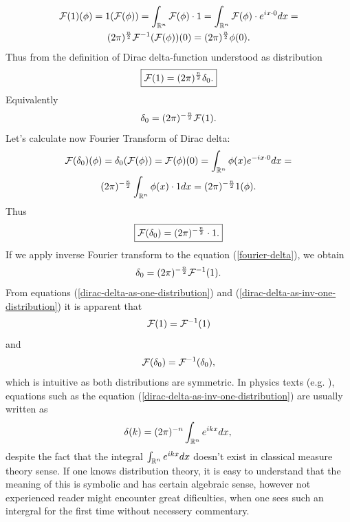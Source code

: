 \documentclass[main.tex]{subfiles}
\begin{document}
\begin{multline}
\\
\mathcal{F}(1)(\phi) = 1(\mathcal{F}(\phi)) = \int_{\mathbb{R}^n} \mathcal{F}(\phi) \cdot 1 = \int_{\mathbb{R}^n} \mathcal{F}(\phi) \cdot e^{ix\cdot 0} dx = \\
(2\pi)^\frac{n}{2}\mathcal{F}^{-1}(\mathcal{F}(\phi))(0) = (2\pi)^\frac{n}{2}\phi(0).\\
\end{multline}
Thus from the definition of Dirac delta-function understood as distribution
\begin{equation}
\boxed{
\label{dirac-delta-as-one-distribution}
\mathcal{F}(1) = (2\pi)^\frac{n}{2}\delta_0. 
}
\end{equation}
Equivalently 
\begin{equation}
\delta_0 = (2\pi)^{-\frac{n}{2}}\mathcal{F}(1).
\end{equation}
Let's calculate now Fourier Transform of Dirac delta:
\begin{multline}
\mathcal{F}(\delta_0)(\phi) = \delta_0 (\mathcal{F}(\phi)) = \mathcal{F}(\phi)(0) =  \int_{\mathbb{R}^n} \phi(x) e^{-ix\cdot 0}dx = \\
(2\pi)^{-\frac{n}{2}} \int_{\mathbb{R}^n} \phi(x) \cdot 1 dx =  (2\pi)^{-\frac{n}{2}} 1(\phi).
\\
\end{multline}
Thus
\begin{equation}
\boxed{
\label{fourier-delta}
\mathcal{F}(\delta_0) = (2\pi)^{-\frac{n}{2}} \cdot 1.
}
\end{equation}
If we apply inverse Fourier transform to the equation (\ref{fourier-delta}), we obtain
\begin{equation}
\label{dirac-delta-as-inv-one-distribution}
\delta_0 = (2\pi)^{-\frac{n}{2}}\mathcal{F}^{-1}(1).
\end{equation}
From equations (\ref{dirac-delta-as-one-distribution}) and (\ref{dirac-delta-as-inv-one-distribution}) it is apparent that
\begin{equation}
\mathcal{F}(1) = \mathcal{F}^{-1}(1)
\end{equation}
and
\begin{equation}
\mathcal{F}(\delta_0) = \mathcal{F}^{-1}(\delta_0),
\end{equation}
which is intuitive as both distributions are symmetric.
In physics texts (e.g. \cite{thomson2016}), equations such as the equation (\ref{dirac-delta-as-inv-one-distribution}) are usually written as
\begin{equation}
\\
\delta(k) = (2\pi)^{-n}\int_{\mathbb{R}^n} e^{ikx}dx,\\
\end{equation}
despite the fact that the integral $\int_{\mathbb{R}^n} e^{ikx}dx$ doesn't exist in classical measure theory sense. If one knows distribution theory, it is easy to understand that the meaning of this is symbolic and has certain algebraic sense, however not experienced reader might encounter great dificulties, when one sees such an intergral for the first time without necessery commentary.
\end{document}
